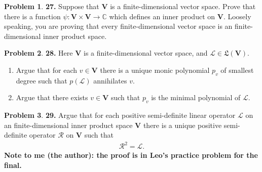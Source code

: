 \documentclass{article}
\theoremstyle{definition}
\newtheorem*{prob*}{Problem}
\newcommand{\V}{\mathbf{V}}
\newcommand{\lag}{\mathcal{L}}
\newcommand{\LL}{\mathfrak{L}}
\begin{document}
\newpage







\begin{prob*}\textbf{27.} Suppose that $\V$ is a finite-dimensional vector space. Prove that there is a function $\psi : \V \times \V \to \mathbb{C}$ which defines an inner product on $\V$. Loosely speaking, you are proving that every finite-dimensional vector space is an finite-dimensional inner product space. 
	
\end{prob*}






\newpage




\begin{prob*}\textbf{28.} Here $\V$ is a finite-dimensional vector space, and $\lag \in \LL(\V)$. 
	\begin{enumerate}
		\item Argue that for each $v\in \V$ there is a unique monic polynomial $p_v$ of smallest degree such that $p(\lag)$ annihilates $v$.
		
		\item Argue that there exists $v\in \V$ such that $p_v$ is the minimal polynomial of $\lag$.
	\end{enumerate}
	
\end{prob*}



\newpage



\begin{prob*}\textbf{29.} Argue that for each positive semi-definite linear operator $\lag$ on an finite-dimensional inner product space $\V$ there is a unique positive semi-definite operator $\mathcal{R}$ on $\V$ such that 
	\begin{align*}
	\mathcal{R}^2 = \lag.
	\end{align*}
	\textbf{Note to me (the author): the proof is in Leo's practice problem for the final.}
	
	
\end{prob*}



\newpage
\end{document}
